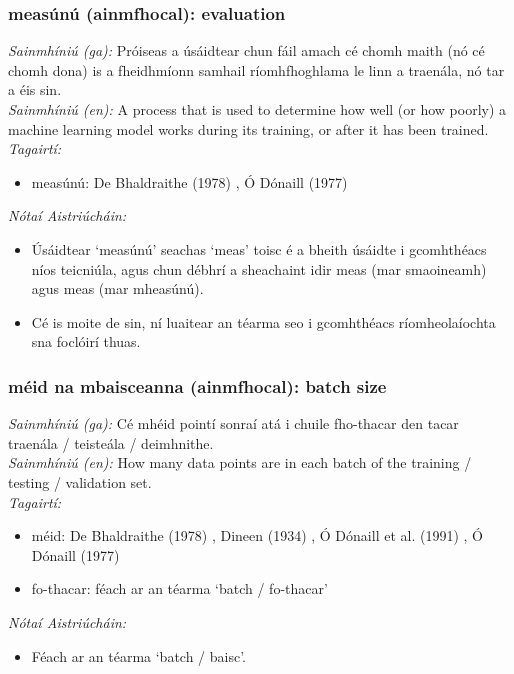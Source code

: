 \subsubsection*{measúnú (ainmfhocal): evaluation}
 \noindent \textit{Sainmhíniú (ga):} Próiseas a úsáidtear chun fáil amach cé chomh maith (nó cé chomh dona) is a fheidhmíonn samhail ríomhfhoghlama le linn a traenála, nó tar a éis sin.
\\
 \noindent \textit{Sainmhíniú (en):} A process that is used to determine how well (or how poorly) a machine learning model works during its training, or after it has been trained.
\\
 \noindent \textit{Tagairtí:}
\begin{itemize}
	\item measúnú: De Bhaldraithe (1978) \cite{de-bhaldraithe}, Ó Dónaill (1977) \cite{odonaill}
\end{itemize}

 \noindent \textit{Nótaí Aistriúcháin:}
\begin{itemize}
	\item Úsáidtear `measúnú' seachas `meas' toisc é a bheith úsáidte i gcomhthéacs níos teicniúla, agus chun débhrí a sheachaint idir meas (mar smaoineamh) agus meas (mar mheasúnú).
	\item Cé is moite de sin, ní luaitear an téarma seo i gcomhthéacs ríomheolaíochta sna foclóirí thuas.
\end{itemize}


\subsubsection*{méid na mbaisceanna (ainmfhocal): batch size}
 \noindent \textit{Sainmhíniú (ga):} Cé mhéid pointí sonraí atá i chuile fho-thacar den tacar traenála / teisteála / deimhnithe.
\\
 \noindent \textit{Sainmhíniú (en):} How many data points are in each batch of the training / testing / validation set.
\\
 \noindent \textit{Tagairtí:}
\begin{itemize}
	\item méid: De Bhaldraithe (1978) \cite{de-bhaldraithe}, Dineen (1934) \cite{dineen}, Ó Dónaill et al. (1991) \cite{focloir-beag}, Ó Dónaill (1977) \cite{odonaill}
	\item fo-thacar: féach ar an téarma `batch / fo-thacar'
\end{itemize}

 \noindent \textit{Nótaí Aistriúcháin:}
\begin{itemize}
	\item Féach ar an téarma `batch / baisc'.
\end{itemize}


